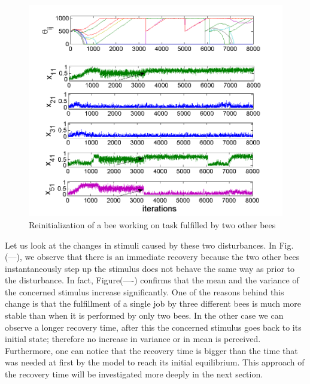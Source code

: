 \begin{center}
\begin{figure}
\centering{}\includegraphics[scale=0.5]{figures/Figure2}\caption{Reinitialization of a bee working on task fulfilled by two other bees}
\label{fig:figure2}
\end{figure}

\par\end{center}

Let us look at the changes in stimuli caused by these two disturbances. In Fig. (---), we observe that there is an immediate recovery because the two other bees instantaneously step up the stimulus does not behave the same way as prior to the disturbance.
In fact, Figure(----) confirms that the mean and the variance of the concerned stimulus increase significantly. One of the reasons behind this change is that the fulfillment of a single job by three different bees is much more stable than when it is performed by only two bees. In the other case we can observe a longer recovery time, after this the concerned stimulus goes back to its initial state; therefore no increase in variance or in mean is perceived. Furthermore, one can notice that the recovery time is bigger than the time that was needed at first by the model to reach its initial equilibrium. This approach of the recovery time will be investigated more deeply in the next section.


